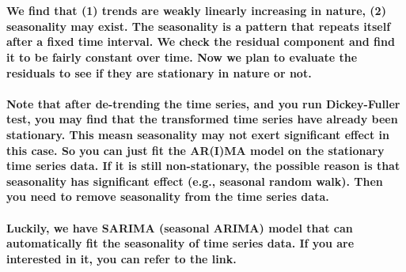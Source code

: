 \documentclass[11pt]{article}
\begin{document}
    \begin{center}
    \end{center}
    { \hspace*{\fill} \\}
    
    \paragraph{We find that (1) trends are weakly linearly increasing in
nature, (2) seasonality may exist. The seasonality is a pattern that
repeats itself after a fixed time interval. We check the residual
component and find it to be fairly constant over time. Now we plan to
evaluate the residuals to see if they are stationary in nature or
not.}\label{we-find-that-1-trends-are-weakly-linearly-increasing-in-nature-2-seasonality-may-exist.-the-seasonality-is-a-pattern-that-repeats-itself-after-a-fixed-time-interval.-we-check-the-residual-component-and-find-it-to-be-fairly-constant-over-time.-now-we-plan-to-evaluate-the-residuals-to-see-if-they-are-stationary-in-nature-or-not.}

\paragraph{Note that after de-trending the time series, and you run
Dickey-Fuller test, you may find that the transformed time series have
already been stationary. This measn seasonality may not exert
significant effect in this case. So you can just fit the AR(I)MA model
on the stationary time series data. If it is still non-stationary, the
possible reason is that seasonality has significant effect (e.g.,
seasonal random walk). Then you need to remove seasonality from the time
series
data.}\label{note-that-after-de-trending-the-time-series-and-you-run-dickey-fuller-test-you-may-find-that-the-transformed-time-series-have-already-been-stationary.-this-measn-seasonality-may-not-exert-significant-effect-in-this-case.-so-you-can-just-fit-the-arima-model-on-the-stationary-time-series-data.-if-it-is-still-non-stationary-the-possible-reason-is-that-seasonality-has-significant-effect-e.g.-seasonal-random-walk.-then-you-need-to-remove-seasonality-from-the-time-series-data.}

\paragraph{Luckily, we have SARIMA (seasonal ARIMA) model that can
automatically fit the seasonality of time series data. If you are
interested in it, you can refer to the
link.}\label{luckily-we-have-sarima-seasonal-arima-model-that-can-automatically-fit-the-seasonality-of-time-series-data.-if-you-are-interested-in-it-you-can-refer-to-the-link.}
\end{document}

